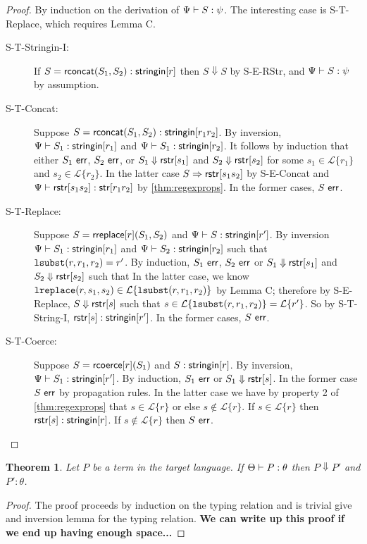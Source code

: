 \documentclass{acm_proc_article-sp}
\newtheorem{thm}{Theorem}
\theoremstyle{definition}
\newcommand{\Lagr}{\mathcal{L}}
\newcommand{\lang}[1]{\Lagr\{#1\}}
\newcommand{\reduces}{ \Rightarrow }
\newcommand{\coerce}[2]{ {\sf rcoerce}[#1](#2)}
\newcommand{\rsconcat}[2]{{\sf rconcat}(#1,#2)} \newcommand{\rconcat}[2]{{\sf rconcat}(#1,#2)} %
\newcommand{\stringin}[1]{{\sf stringin}[#1]}
\renewcommand{\tstr}[1]{{{\sf str}[#1]}}
\newcommand{\lsubst}[3]{{\tt lsubst}(#1,#2,#3)} %
\newcommand{\lreplace}[3]{{\tt lreplace}(#1, #2, #3)}
\newcommand{\err}{\ {\sf err}}
\newcommand{\sreduces}{ \Downarrow }
\begin{document}
\begin{proof}
By induction on the derivation of $\Psi \vdash S : \psi$. The interesting case
is S-T-Replace, which requires Lemma C.

\begin{description}
\item[S-T-Stringin-I:]
If $S = \rsconcat{S_1}{S_2} : \stringin{r}$ then
$S \sreduces S$ by S-E-RStr, and $\Psi \vdash S : \psi$ by assumption.

\item[S-T-Concat:] 
Suppose $S = \rsconcat{S_1}{S_2} : \stringin{r_1 r_2}$.
By inversion, $\sctx \vdash S_1 : \stringin{r_1}$ and $\sctx \vdash S_1 : \stringin{r_2}$.
It follows by induction that either $S_1 \err$, $S_2 \err$, 
or $S_1 \sreduces \rstr{s_1}$ and $S_2 \sreduces \rstr{s_2}$ for some $s_1 \in \lang{r_1}$ and $s_2 \in \lang{r_2}$.
In the latter case $S \reduces \rstr{s_1s_2}$ by S-E-Concat and $\sctx \vdash \rstr{s_1s_2} : \tstr{r_1r_2}$ by \ref{thm:regexprops}.
In the former cases, $S \err$.

\item[S-T-Replace:]
Suppose $S = {\sf rreplace}[r](S_1,S_2)$ and $\sctx \vdash S : \stringin{r'}$.
By inversion $\sctx \vdash S_1 : \stringin{r_1}$ and $\sctx \vdash S_2 : \stringin{r_2}$ such that $\lsubst{r}{r_1}{r_2} = r'$.
By induction, $S_1 \err$, $S_2 \err$ 
or $S_1 \sreduces \rstr{s_1}$ and $S_2 \sreduces \rstr{s_2}$ such that 
In the latter case, we know $\lreplace{r}{s_1}{s_2} \in \lang{\lsubst{r}{r_1}{r_2}}$ by Lemma C;
therefore by S-E-Replace, $S \sreduces \rstr{s}$ such that  $s \in \lang{\lsubst{r}{r_1}{r_2}} = \lang{r'}$.
So by S-T-String-I, $\rstr{s} : \stringin{r'}$.
In the former cases, $S \err$.

\item[S-T-Coerce:]
Suppose $S = \coerce{r}{S_1}$ and $S : \stringin{r}$.
By inversion, $\sctx \vdash S_1 : \stringin{r'}$.
By induction, $S_1 \err$ or $S_1 \sreduces \rstr{s}$.
In the former case $S \err$ by propagation rules.
In the latter case we have by property 2 of \ref{thm:regexprops} that $s \in \lang{r}$ or else
$s \not \in \lang{r}$.
If $s \in \lang{r}$ then $\rstr{s} : \stringin{r}$.
If $s \not \in \lang{r}$ then $S \err$. 
\end{description}
\end{proof}

\begin{thm}
  Let $P$ be a term in the target language. If $\Theta \vdash P : \theta$ 
  then $P \sreduces P'$ and $P' : \theta$.
\end{thm}
\begin{proof}
The proof proceeds by induction on the typing relation and is trivial give
and inversion lemma for the typing relation. \textbf{We can write up this proof if we end up having enough space...}
\end{proof}
\end{document}
